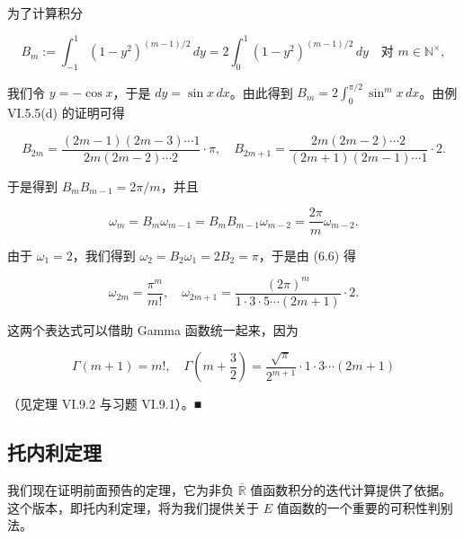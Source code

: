 \begin{example}

为了计算积分

\[
B_m := \int_{-1}^{1} (1 - y^2)^{(m-1)/2} \, dy = 2 \int_{0}^{1} (1 - y^2)^{(m-1)/2} \, dy \quad \text{对 } m \in \mathbb{N}^{\times} ,
\]

我们令 $ y = -\cos x $，于是 $ dy = \sin x \, dx $。由此得到 $ B_m = 2 \int_{0}^{\pi/2} \sin^m x \, dx $。由例 VI.5.5(d) 的证明可得

\[
B_{2m} = \frac{(2m-1)(2m-3) \cdots 1}{2m(2m-2) \cdots 2} \cdot \pi , \quad B_{2m+1} = \frac{2m(2m-2) \cdots 2}{(2m+1)(2m-1) \cdots 1} \cdot 2 .
\]

于是得到 $ B_m B_{m-1} = 2\pi/m $，并且

\begin{equation}
\omega_m = B_m \omega_{m-1} = B_m B_{m-1} \omega_{m-2} = \frac{2\pi}{m} \omega_{m-2} .\tag{6.6}
\end{equation}

由于 $ \omega_1 = 2 $，我们得到 $ \omega_2 = B_2 \omega_1 = 2B_2 = \pi $，于是由 (6.6) 得

\[
\omega_{2m} = \frac{\pi^m}{m!} , \quad \omega_{2m+1} = \frac{(2\pi)^m}{1 \cdot 3 \cdot 5 \cdots (2m+1)} \cdot 2 .
\]

这两个表达式可以借助 Gamma 函数统一起来，因为

\[
\Gamma(m+1) = m! , \quad \Gamma\left(m + \frac{3}{2}\right) = \frac{\sqrt{\pi}}{2^{m+1}} \cdot 1 \cdot 3 \cdots (2m+1)
\]

（见定理 VI.9.2 与习题 VI.9.1）。\nobreak\hspace{0.35em}■

\end{example}

\subsection*{托内利定理}

我们现在证明前面预告的定理，它为非负 $ \overline{\mathbb{R}} $ 值函数积分的迭代计算提供了依据。这个版本，即托内利定理，将为我们提供关于 $ E $ 值函数的一个重要的可积性判别法。

